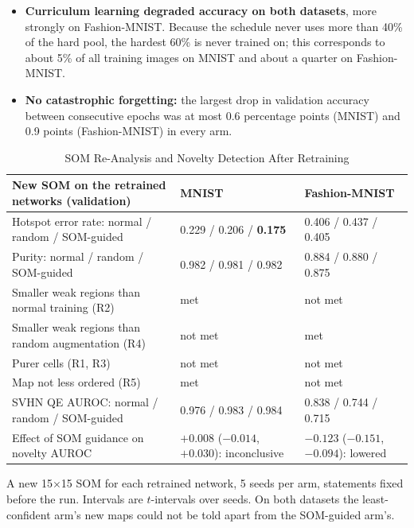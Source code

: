 \documentclass{scrartcl}
\begin{document}
\begin{itemize}
  \item \textbf{Curriculum learning degraded accuracy on both datasets}, more strongly on Fashion-MNIST. Because the schedule never uses more than 40\% of the hard pool, the hardest 60\% is never trained on; this corresponds to about 5\% of all training images on MNIST and about a quarter on Fashion-MNIST.
  \item \textbf{No catastrophic forgetting:} the largest drop in validation accuracy between consecutive epochs was at most 0.6 percentage points (MNIST) and 0.9 points (Fashion-MNIST) in every arm.
\end{itemize}

\begin{table}[H]
\centering
\caption{SOM Re-Analysis and Novelty Detection After Retraining}
\label{tab:reanalysis}
\renewcommand{\arraystretch}{1.12}
\footnotesize
\begin{tabular}{|L{0.42\textwidth}|C{0.23\textwidth}|C{0.23\textwidth}|}
\hline
\textbf{New SOM on the retrained networks (validation)} & \textbf{MNIST} & \textbf{Fashion-MNIST} \\ \hline
Hotspot error rate: normal / random / SOM-guided & 0.229 / 0.206 / \textbf{0.175} & 0.406 / 0.437 / 0.405 \\ \hline
Purity: normal / random / SOM-guided & 0.982 / 0.981 / 0.982 & 0.884 / 0.880 / 0.875 \\ \hline
Smaller weak regions than normal training (R2) & met & not met \\ \hline
Smaller weak regions than random augmentation (R4) & not met & met \\ \hline
Purer cells (R1, R3) & not met & not met \\ \hline
Map not less ordered (R5) & met & not met \\ \hline
SVHN QE AUROC: normal / random / SOM-guided & 0.976 / 0.983 / 0.984 & 0.838 / 0.744 / 0.715 \\ \hline
Effect of SOM guidance on novelty AUROC & $+0.008$ ($-0.014$, $+0.030$): inconclusive & $-0.123$ ($-0.151$, $-0.094$): lowered \\ \hline
\end{tabular}

\par\vspace{3pt}
{\footnotesize\raggedright\noindent A new 15$\times$15 SOM for each retrained network, 5 seeds per arm, statements fixed before the run. Intervals are $t$-intervals over seeds. On both datasets the least-confident arm's new maps could not be told apart from the SOM-guided arm's.\par}
\end{table}
\end{document}
